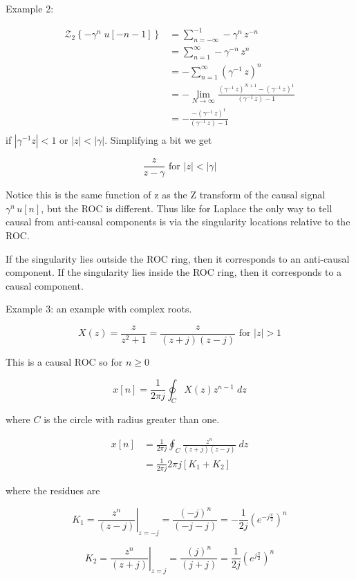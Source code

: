 \documentclass{article}
\begin{document}
Example 2:

$$
\begin{aligned}
  \mathcal{Z}_2\left\{ -\gamma^n\; u[-n-1]\right\} &= \sum\limits_{n = -\infty}^{-1} -\gamma^n\, z^{-n}\\
  &= \sum\limits_{n = 1}^{\infty} -\gamma^{-n}\, z^{n}\\
  &= -\sum\limits_{n = 1}^{\infty} \left(\gamma^{-1}\, z\right)^n\\
  &= - \lim_{N\rightarrow\infty} \frac{\left(\gamma^{-1}\, z\right)^{N+1} - \left(\gamma^{-1}\, z\right)^{1}}{\left(\gamma^{-1}\, z\right) - 1}\\
  &= - \frac{ - \left(\gamma^{-1}\, z\right)^{1}}{\left(\gamma^{-1}\, z\right) - 1}\\
\end{aligned}
$$
if $|\gamma^{-1} z| < 1$ or $|z| < |\gamma|$. Simplifying a bit we get

$$
\frac{z}{z-\gamma} \text{ for } |z| < |\gamma|
$$

Notice this is the same function of z as the Z transform of the causal signal $\gamma^n\, u[n]$, but the ROC is different. Thus like for Laplace the only way to tell causal from anti-causal components is via the singularity locations relative to the ROC.

If the singularity lies outside the ROC ring, then it corresponds to an anti-causal component. If the singularity lies inside the ROC ring, then it corresponds to a causal component. 

Example 3: an example with complex roots.

$$
X(z) = \frac{z}{z^2 + 1} = \frac{z}{(z+j)(z-j)} \text{ for } |z| > 1
$$

This is a causal ROC so for $n \geq 0$

$$
x[n] = \frac{1}{2\pi j} \oint_C X(z) z^{n-1}\; dz
$$

where $C$ is the circle with radius greater than one.

$$
\begin{aligned}
  x[n] &= \frac{1}{2\pi j} \oint_C \frac{z^n}{(z+j)(z-j)}\; dz\\
  &= \frac{1}{2\pi j} 2\pi j[K_1 + K_2] 
\end{aligned}
$$

where the residues are

$$
K_1 = \left. \frac{z^n}{(z-j)} \right|_{z = -j} = \frac{(-j)^n}{(-j-j)} = -\frac{1}{2j} \left(e^{-j\frac{\pi}{2}}\right)^n 
$$

$$
K_2 = \left. \frac{z^n}{(z+j)} \right|_{z = j} = \frac{(j)^n}{(j+j)} = \frac{1}{2j} \left(e^{j\frac{\pi}{2}}\right)^n 
$$
\end{document}
